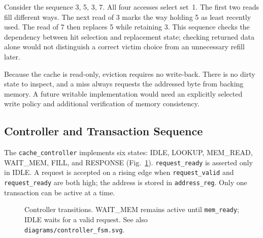 \documentclass[conference]{IEEEtran}
\begin{document}
Consider the sequence 3, 5, 3, 7. All four accesses select set~1. The
first two reads fill different ways. The next read of 3 marks the way
holding 5 as least recently used. The read of 7 then replaces 5 while
retaining 3. This sequence checks the dependency between hit selection
and replacement state; checking returned data alone would not
distinguish a correct victim choice from an unnecessary refill later.

Because the cache is read-only, eviction requires no write-back. There
is no dirty state to inspect, and a miss always requests the addressed
byte from backing memory. A future writable implementation would need
an explicitly selected write policy and additional verification of
memory consistency.

\subsection{Controller and Transaction Sequence}

The \texttt{cache\_controller} implements six states: IDLE, LOOKUP,
MEM\_READ, WAIT\_MEM, FILL, and RESPONSE (Fig.~\ref{fig:fsm}).
\texttt{request\_ready} is asserted only in IDLE. A request is accepted
on a rising edge when \texttt{request\_valid} and
\texttt{request\_ready} are both high; the address is stored in
\texttt{address\_reg}. Only one transaction can be active at a time.

\begin{figure}[!t]
\centering
{}
\caption{Controller transitions. WAIT\_MEM remains active until
\texttt{mem\_ready}; IDLE waits for a valid request. See also
\texttt{diagrams/controller\_fsm.svg}.}
\label{fig:fsm}
\end{figure}
\end{document}
